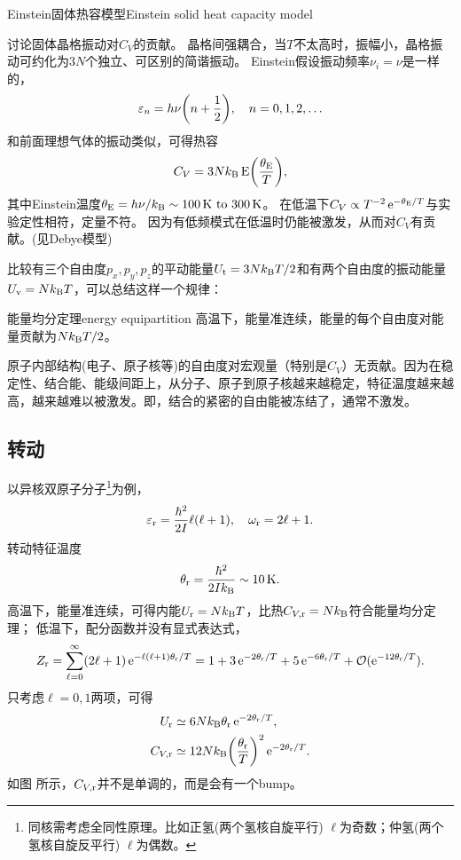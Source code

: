 \begin{example}
	{Einstein固体热容模型}{Einstein solid heat capacity model}

	讨论固体晶格振动对$C_V$的贡献。
	晶格间强耦合，当$T$不太高时，振幅小，晶格振动可约化为$3N$个独立、可区别的简谐振动。
	Einstein假设振动频率$\nu_i=\nu$是一样的，
	\[
		\varepsilon_n=h\nu\biggl(n+\frac12\biggr),\quad n=0,1,2,\ldots
	\]
	和前面理想气体的振动类似，可得热容
	\[
		C_V=3Nk_{\mathrm B}\operatorname{E}\biggl(\frac{\theta_{\operatorname{E}}}T\biggr),
	\]
	其中Einstein温度$\theta_{\Einst}=h\nu/\kB\sim\SIrange{100}{300}\K$。
	在低温下$C_V\propto T^{-2}\mathop{}\!\mathrm{e}^{-\theta_{\operatorname{E}}/T}$与实验定性相符，定量不符。
	因为有低频模式在低温时仍能被激发，从而对$C_V$有贡献。(见Debye模型)

\end{example}

比较有三个自由度$p_x,p_y,p_z$的平动能量$U_\mathrm t=3Nk_{\mathrm B} T/2$和有两个自由度的振动能量$U_\mathrm v=Nk_{\mathrm B} T$，可以总结这样一个规律：

\begin{theorem}{能量均分定理}{energy equipartition}
	高温下，能量准连续，能量的每个自由度对能量贡献为$Nk_{\mathrm B} T/2$。
\end{theorem}

\begin{remark}
	原子内部结构(电子、原子核等)的自由度对宏观量（特别是$C_V$）无贡献。因为在稳定性、结合能、能级间距上，从分子、原子到原子核越来越稳定，特征温度越来越高，越来越难以被激发。即，结合的紧密的自由能被冻结了，通常不激发。
\end{remark}

\subsection{转动}
\label{ssec:rotation}

以异核双原子分子\footnote{同核需考虑全同性原理。比如正氢(两个氢核自旋平行) $\ell$为奇数；仲氢(两个氢核自旋反平行) $\ell$为偶数。}为例，
\[
	\varepsilon_\mathrm r=\frac{\hbar^2}{2I}\ell(\ell+1),\quad\omega_\mathrm r=2\ell+1.
\]
转动特征温度
\[
	\theta_\rt=\frac{\hbar^2}{2I\kB}\sim\SI{10}\K.
\]
高温下，能量准连续，可得内能$U_\mathrm r=Nk_{\mathrm B} T$，比热$C_{V,\mathrm r}=Nk_{\mathrm B}$符合能量均分定理；
低温下，配分函数并没有显式表达式，
\[
	Z_\mathrm r=\sum_{\ell=0}^\infty(2\ell+1)\mathop{}\!\mathrm{e}^{-\ell(\ell+1)\theta_\mathrm r/T}=1+3\mathop{}\!\mathrm{e}^{-2\theta_\mathrm r/T}+5\mathop{}\!\mathrm{e}^{-6\theta_\mathrm r/T}+\mathcal O(\mathop{}\!\mathrm{e}^{-12\theta_\mathrm r/T}).
\]
只考虑$\ell=0,1$两项，可得
\begin{subequations}
	\begin{align}
		U_\mathrm r&\simeq 6Nk_{\mathrm B}\theta_\mathrm r\mathop{}\!\mathrm{e}^{-2\theta_\mathrm r/T},\\
		C_{V,\mathrm r}&\simeq 12Nk_{\mathrm B}\biggl(\frac{\theta_\mathrm r}T\biggr)^2\mathop{}\!\mathrm{e}^{-2\theta_\mathrm r/T}.
	\end{align}
\end{subequations}
如图 所示，$C_{V,\mathrm r}$并不是单调的，而是会有一个bump。

